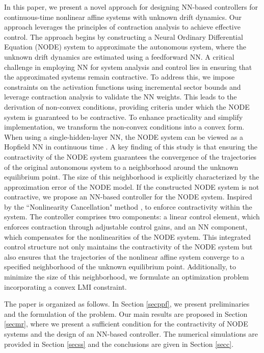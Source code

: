 \documentclass[journal,twoside,web]{ieeecolor}
\begin{document}
In this paper, we present a novel approach for designing NN-based controllers for continuous-time nonlinear affine systems with unknown drift dynamics. Our approach leverages the principles of contraction analysis to achieve effective control. The approach begins by constructing a Neural Ordinary Differential Equation (NODE) \cite{chen2018neural} system to approximate the autonomous system, where the unknown drift dynamics are estimated using a feedforward NN. A critical challenge in employing NN for system analysis and control lies in ensuring that the approximated systems remain contractive. To address this, we impose constraints on the activation functions using incremental sector bounds and leverage contraction analysis to validate the NN weights. This leads to the derivation of non-convex conditions, providing criteria under which the NODE system is guaranteed to be contractive. To enhance practicality and simplify implementation, we transform the non-convex conditions into a convex form. When using a single-hidden-layer NN, the NODE system can be viewed as a Hopfield NN in continuous time \cite{davydov2024non}. 
A key finding of this study is that ensuring the contractivity of the NODE system guarantees the convergence of the trajectories of the original autonomous system to a neighborhood around the unknown equilibrium point. The size of this neighborhood is explicitly characterized by the approximation error of the NODE model. If the constructed NODE system is not contractive, we propose an NN-based controller for the NODE system. Inspired by the ``Nonlinearity Cancellation" method \cite{de2023learning}, to enforce contractivity within the system. The controller comprises two components: a linear control element, which enforces contraction through adjustable control gains, and an NN component, which compensates for the nonlinearities of the NODE system. This integrated control structure not only maintains the contractivity of the NODE system but also ensures that the trajectories of the nonlinear affine system converge to a specified neighborhood of the unknown equilibrium point. Additionally, to minimize the size of this neighborhood, we formulate an optimization problem incorporating a convex LMI constraint.

The paper is organized as follows. In Section \ref{secppf}, we present preliminaries and the formulation of the problem. Our main results are proposed in Section \ref{secmr}, where we present a sufficient condition for the contractivity of NODE systems and the design of an NN-based controller.  The numerical simulations are provided
in Section \ref{secss} and the conclusions are given in Section \ref{secc}. 
\end{document}
